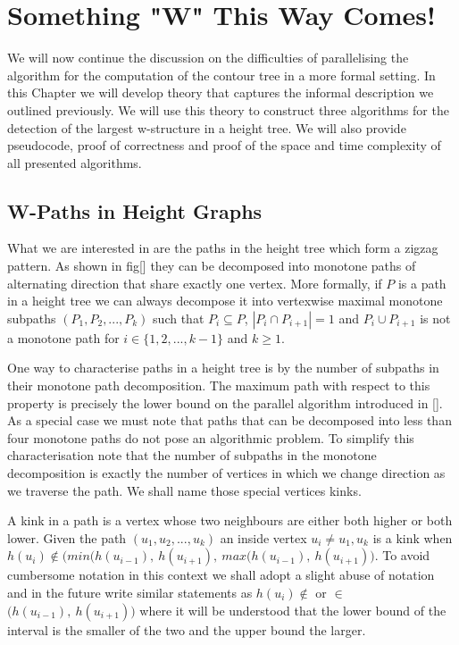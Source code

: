 \chapter{Something "W" This Way Comes!}
\label{chapter2}

We will now continue the discussion on the difficulties of parallelising the algorithm for the computation of the contour tree in a more formal setting. In this Chapter we will develop theory that captures the informal description we outlined previously. We will use this theory to construct three algorithms for the detection of the largest w-structure in a height tree. We will also provide pseudocode, proof of correctness and proof of the space and time complexity of all presented algorithms.

\section{W-Paths in Height Graphs}

What we are interested in are the paths in the height tree which form a zigzag pattern. As shown in fig[] they can be decomposed into monotone paths of alternating direction that share exactly one vertex. More formally, if $P$ is a path in a height tree we can always decompose it into vertexwise maximal monotone subpaths $(P_1, P_2, ..., P_k)$ such that $P_i \subseteq P$, $|P_i \cap P_{i+1}| = 1$ and $P_i \cup P_{i+1}$ is not a monotone path for $i \in \{1, 2, ..., k-1\}$ and $k \ge 1$. 

One way to characterise paths in a height tree is by the number of subpaths in their monotone path decomposition. The maximum path with respect to this property is precisely the lower bound on the parallel algorithm introduced in []. As a special case we must note that paths that can be decomposed into less than four monotone paths do not pose an algorithmic problem. To simplify this characterisation note that the number of subpaths in the monotone decomposition is exactly the number of vertices in which we change direction as we traverse the path. We shall name those special vertices kinks.

A kink in a path is a vertex whose two neighbours are either both higher or both lower. Given the path $(u_1, u_2, ... , u_k)$ an inside vertex $u_i \ne u_1, u_k$ is a kink when $h(u_i) \notin \big( min(h(u_{i-1}),~h(u_{i+1}),~max(h(u_{i-1}),~h(u_{i+1}) \big)$. To avoid cumbersome notation in this context we shall adopt a slight abuse of notation and in the future write similar statements as $h(u_i) \notin $ or $ \in $ $\big(h(u_{i-1}),~h(u_{i+1}) \big)$ where it will be understood that the lower bound of the interval is the smaller of the two and the upper bound the larger.

